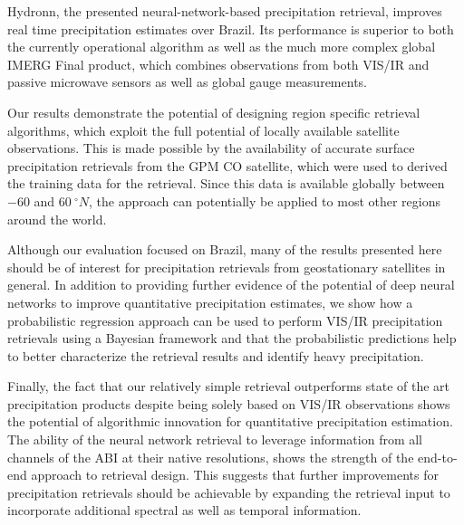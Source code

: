 \documentclass[journal abbreviation, manuscript]{copernicus}
\begin{document}
\conclusions

Hydronn, the presented neural-network-based precipitation retrieval, improves
real time precipitation estimates over Brazil. Its performance is superior to
both the currently operational algorithm as well as the much more complex global
IMERG Final product, which combines observations from both VIS/IR and passive
microwave sensors as well as global gauge measurements.

Our results demonstrate the potential of designing region specific retrieval
algorithms, which exploit the full potential of locally available satellite
observations. This is made possible by the availability of accurate surface
precipitation retrievals from the GPM CO satellite, which were used to derived
the training data for the retrieval. Since this data is available globally
between $-60$ and $60\ \unit{^\circ N}$, the approach can potentially be applied
to most other regions around the world.

Although our evaluation focused on Brazil, many of the results presented here
should be of interest for precipitation retrievals from geostationary satellites
in general. In addition to providing further evidence of the potential of deep
neural networks to improve quantitative precipitation estimates, we show how a
probabilistic regression approach can be used to perform VIS/IR precipitation
retrievals using a Bayesian framework and that the probabilistic predictions help
to better characterize the retrieval results and identify heavy precipitation.

Finally, the fact that our relatively simple retrieval outperforms state of the
art precipitation products despite being solely based on VIS/IR observations
shows the potential of algorithmic innovation for quantitative precipitation
estimation. The ability of the neural network retrieval to leverage information
from all channels of the ABI at their native resolutions, shows the strength of
the end-to-end approach to retrieval design. This suggests that further
improvements for precipitation retrievals should be achievable by expanding the
retrieval input to incorporate additional spectral as well as temporal
information.





\end{document}
